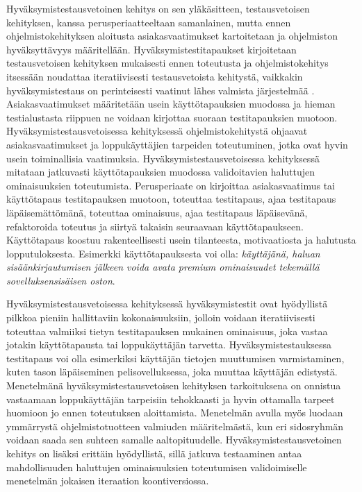   Hyväksymistestausvetoinen kehitys on sen yläkäsitteen, testausvetoisen kehityksen, kanssa perusperiaatteeltaan samanlainen, mutta ennen ohjelmistokehityksen aloitusta asiakasvaatimukset kartoitetaan ja ohjelmiston hyväksyttävyys määritellään.
  Hyväksymistestitapaukset kirjoitetaan testausvetoisen kehityksen mukaisesti ennen toteutusta ja ohjelmistokehitys itsessään noudattaa iteratiivisesti testausvetoista kehitystä, vaikkakin hyväksymistestaus on perinteisesti vaatinut lähes valmista järjestelmää \parencite{traditional_acceptance_testing}.
  Asiakasvaatimukset määritetään usein käyttötapauksien muodossa ja hieman testialustasta riippuen ne voidaan kirjottaa suoraan testitapauksien muotoon.
  Hyväksymistestausvetoisessa kehityksessä ohjelmistokehitystä ohjaavat asiakasvaatimukset ja loppukäyttäjien tarpeiden toteutuminen, jotka ovat hyvin usein toiminallisia vaatimuksia.
  Hyväksymistestausvetoisessa kehityksessä mitataan jatkuvasti käyttötapauksien muodossa validoitavien haluttujen ominaisuuksien toteutumista.
  Perusperiaate on kirjoittaa asiakasvaatimus tai käyttötapaus testitapauksen muotoon, toteuttaa testitapaus, ajaa testitapaus läpäisemättömänä, toteuttaa ominaisuus, ajaa testitapaus läpäisevänä, refaktoroida toteutus ja siirtyä takaisin seuraavaan käyttötapaukseen.
  Käyttötapaus koostuu rakenteellisesti usein tilanteesta, motivaatiosta ja halutusta lopputuloksesta.
  Esimerkki käyttötapauksesta voi olla: \emph{käyttäjänä, haluan sisäänkirjautumisen jälkeen voida avata premium ominaisuudet tekemällä sovelluksensisäisen oston}.

  Hyväksymistestausvetoisessa kehityksessä hyväksymistestit ovat hyödyllistä pilkkoa pieniin hallittaviin kokonaisuuksiin, jolloin voidaan iteratiivisesti toteuttaa valmiiksi tietyn testitapauksen mukainen ominaisuus, joka vastaa jotakin käyttötapausta tai loppukäyttäjän tarvetta.
  Hyväksymistestauksessa testitapaus voi olla esimerkiksi käyttäjän tietojen muuttumisen varmistaminen, kuten tason läpäiseminen pelisovelluksessa, joka muuttaa käyttäjän edistystä.
  Menetelmänä hyväksymistestausvetoisen kehityksen tarkoituksena on onnistua vastaamaan loppukäyttäjän tarpeisiin tehokkaasti ja hyvin ottamalla tarpeet huomioon jo ennen toteutuksen aloittamista.
  Menetelmän avulla myös luodaan ymmärrystä ohjelmistotuotteen valmiuden määritelmästä, kun eri sidosryhmän voidaan saada sen suhteen samalle aaltopituudelle.
  Hyväksymistestausvetoinen kehitys on lisäksi erittäin hyödyllistä, sillä jatkuva testaaminen antaa mahdollisuuden haluttujen ominaisuuksien toteutumisen validoimiselle menetelmän jokaisen iteraation koontiversiossa.

